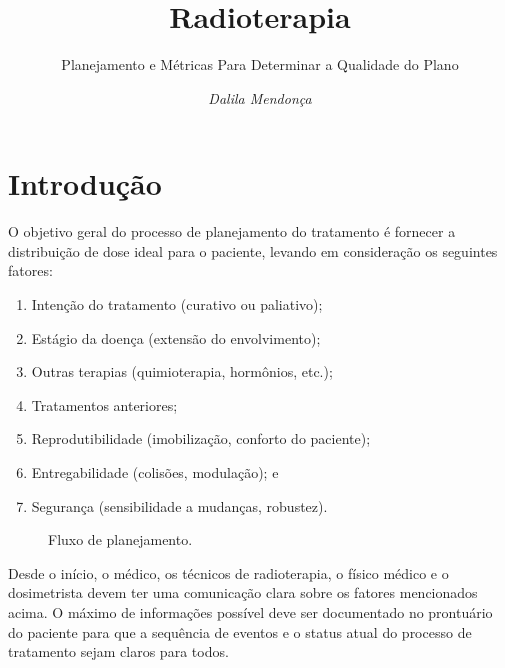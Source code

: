 \documentclass[11pt,a4paper]{article}
\title{\LobsterTwo\Huge{Radioterapia}}
\author{\LobsterTwo\Large{Planejamento e Métricas Para Determinar a Qualidade do Plano}\nocite{*}}
\date{\LobsterTwo\textit{Dalila Mendonça}}
\begin{document}
	\maketitle

\section{Introdução}

	O objetivo geral do processo de planejamento do tratamento é fornecer a distribuição de dose ideal para o paciente, levando em consideração os seguintes fatores:

	\begin{enumerate}[label=\textcolor{CarnationPink}{(\roman*)}]
		\item Intenção do tratamento (curativo ou paliativo);
		\item Estágio da doença (extensão do envolvimento);
		\item Outras terapias (quimioterapia, hormônios, etc.);
		\item Tratamentos anteriores;
		\item Reprodutibilidade (imobilização, conforto do paciente);
		\item Entregabilidade (colisões, modulação); e
		\item Segurança (sensibilidade a mudanças, robustez).
	\end{enumerate}

	\begin{figure}
		\centering
		\caption{Fluxo de planejamento.}
		\label{fig:FluxogramadePlanejamento}
	\end{figure}

	Desde o início, o médico, os técnicos de radioterapia, o físico médico e o dosimetrista devem ter uma comunicação clara sobre os fatores mencionados acima. O máximo de informações possível deve ser documentado no prontuário do paciente para que a sequência de eventos e o status atual do processo de tratamento sejam claros para todos. 
	
\end{document}
